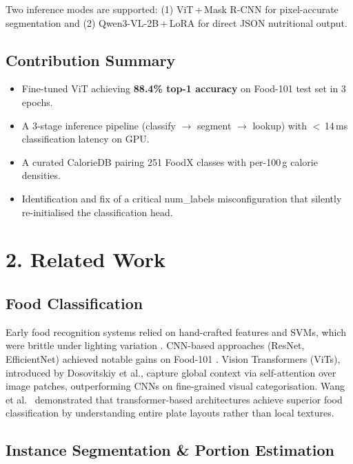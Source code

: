 \documentclass[fleqn,10pt]{SelfArx}
\begin{document}
Two inference modes are supported: (1) ViT\,+\,Mask R-CNN for pixel-accurate segmentation and (2) Qwen3-VL-2B\,+\,LoRA for direct JSON nutritional output.

\subsection{Contribution Summary}

\begin{itemize}[noitemsep]
    \item Fine-tuned ViT achieving \textbf{88.4\% top-1 accuracy} on Food-101 test set in 3 epochs.
    \item A 3-stage inference pipeline (classify $\rightarrow$ segment $\rightarrow$ lookup) with $<$\,14\,ms classification latency on GPU.
    \item A curated CalorieDB pairing 251 FoodX classes with per-100\,g calorie densities.
    \item Identification and fix of a critical num\_labels misconfiguration that silently re-initialised the classification head.
\end{itemize}

\section{2. Related Work}

\subsection{Food Classification}

Early food recognition systems relied on hand-crafted features and SVMs, which were brittle under lighting variation \cite{prenet2024}. CNN-based approaches (ResNet, EfficientNet) achieved notable gains on Food-101 \cite{multimodalfood2024}. Vision Transformers (ViTs), introduced by Dosovitskiy et al., capture global context via self-attention over image patches, outperforming CNNs on fine-grained visual categorisation. Wang et al.\ \cite{wang2024swin} demonstrated that transformer-based architectures achieve superior food classification by understanding entire plate layouts rather than local textures.

\subsection{Instance Segmentation \& Portion Estimation}
\end{document}
